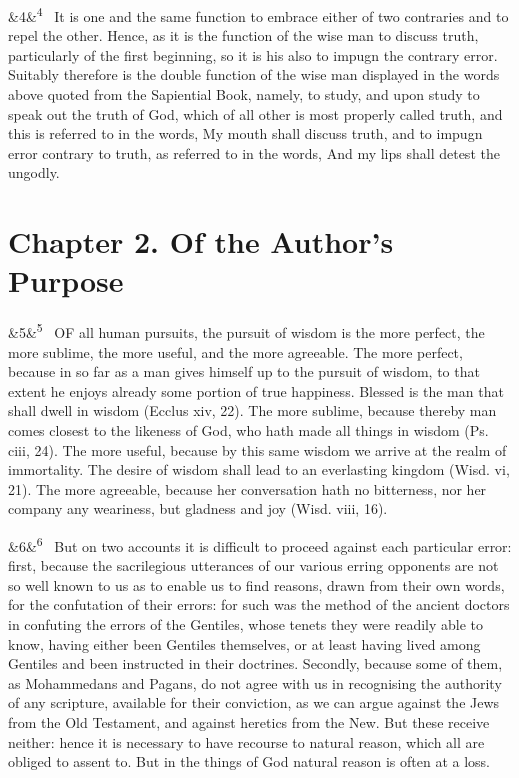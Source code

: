 \documentclass[12pt]{article}
\newcommand{\para}[1][]{\par\noindent\ifx&#1&\else\textsuperscript{\footnotesize #1}~\fi}
\begin{document}
\para[4] It is one and the same function to embrace either of two contraries and to repel the other. Hence, as it is the function of the wise man to discuss truth, particularly of the first beginning, so it is his also to impugn the contrary error. Suitably therefore is the double function of the wise man displayed in the words above quoted from the Sapiential Book, namely, to study, and upon study to speak out the truth of God, which of all other is most properly called truth, and this is referred to in the words, My mouth shall discuss truth, and to impugn error contrary to truth, as referred to in the words, And my lips shall detest the ungodly.

\section*{Chapter 2. Of the Author's Purpose}

\para[5] OF all human pursuits, the pursuit of wisdom is the more perfect, the more sublime, the more useful, and the more agreeable. The more perfect, because in so far as a man gives himself up to the pursuit of wisdom, to that extent he enjoys already some portion of true happiness. Blessed is the man that shall dwell in wisdom (Ecclus xiv, 22). The more sublime, because thereby man comes closest to the likeness of God, who hath made all things in wisdom (Ps. ciii, 24). The more useful, because by this same wisdom we arrive at the realm of immortality. The desire of wisdom shall lead to an everlasting kingdom (Wisd. vi, 21). The more agreeable, because her conversation hath no bitterness, nor her company any weariness, but gladness and joy (Wisd. viii, 16).

\para[6] But on two accounts it is difficult to proceed against each particular error: first, because the sacrilegious utterances of our various erring opponents are not so well known to us as to enable us to find reasons, drawn from their own words, for the confutation of their errors: for such was the method of the ancient doctors in confuting the errors of the Gentiles, whose tenets they were readily able to know, having either been Gentiles themselves, or at least having lived among Gentiles and been instructed in their doctrines. Secondly, because some of them, as Mohammedans and Pagans, do not agree with us in recognising the authority of any scripture, available for their conviction, as we can argue against the Jews from the Old Testament, and against heretics from the New. But these receive neither: hence it is necessary to have recourse to natural reason, which all are obliged to assent to. But in the things of God natural reason is often at a loss.
\end{document}
